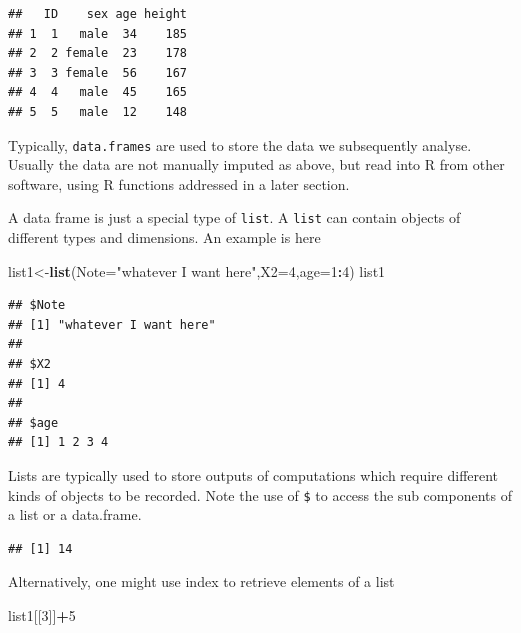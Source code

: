 \documentclass[
]{article}
\newenvironment{Shaded}{\begin{snugshade}}{\end{snugshade}}
\newcommand{\AttributeTok}[1]{\textcolor[rgb]{0.13,0.29,0.53}{#1}}
\newcommand{\DecValTok}[1]{\textcolor[rgb]{0.00,0.00,0.81}{#1}}
\newcommand{\FunctionTok}[1]{\textcolor[rgb]{0.13,0.29,0.53}{\textbf{#1}}}
\newcommand{\NormalTok}[1]{#1}
\newcommand{\OtherTok}[1]{\textcolor[rgb]{0.56,0.35,0.01}{#1}}
\newcommand{\SpecialCharTok}[1]{\textcolor[rgb]{0.81,0.36,0.00}{\textbf{#1}}}
\newcommand{\StringTok}[1]{\textcolor[rgb]{0.31,0.60,0.02}{#1}}
\begin{document}
\begin{verbatim}
##   ID    sex age height
## 1  1   male  34    185
## 2  2 female  23    178
## 3  3 female  56    167
## 4  4   male  45    165
## 5  5   male  12    148
\end{verbatim}

Typically, \texttt{data.frames} are used to store the data we
subsequently analyse. Usually the data are not manually imputed as
above, but read into R from other software, using R functions addressed
in a later section.

A data frame is just a special type of \texttt{list}. A \texttt{list}
can contain objects of different types and dimensions. An example is
here

\begin{Shaded}
\begin{Highlighting}[]
\NormalTok{list1}\OtherTok{\textless{}{-}}\FunctionTok{list}\NormalTok{(}\AttributeTok{Note=}\StringTok{"whatever I want here"}\NormalTok{,}\AttributeTok{X2=}\DecValTok{4}\NormalTok{,}\AttributeTok{age=}\DecValTok{1}\SpecialCharTok{:}\DecValTok{4}\NormalTok{)}
\NormalTok{list1}
\end{Highlighting}
\end{Shaded}

\begin{verbatim}
## $Note
## [1] "whatever I want here"
## 
## $X2
## [1] 4
## 
## $age
## [1] 1 2 3 4
\end{verbatim}

Lists are typically used to store outputs of computations which require
different kinds of objects to be recorded. Note the use of \texttt{\$}
to access the sub components of a list or a data.frame.

\begin{Shaded}
\end{Shaded}

\begin{verbatim}
## [1] 14
\end{verbatim}

Alternatively, one might use index to retrieve elements of a list

\begin{Shaded}
\begin{Highlighting}[]
\NormalTok{list1[[}\DecValTok{3}\NormalTok{]]}\SpecialCharTok{+}\DecValTok{5}
\end{Highlighting}
\end{Shaded}
\end{document}
